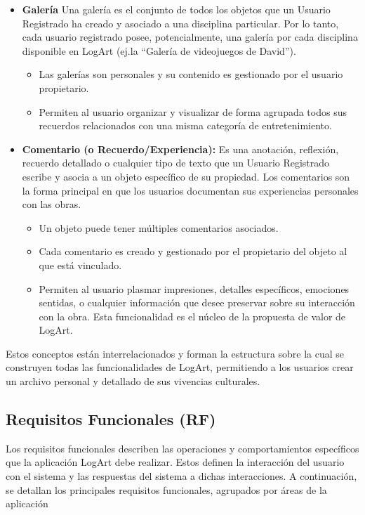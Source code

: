 \begin{itemize}
    \item \textbf{Galería} Una galería es el conjunto de todos los objetos que un Usuario Registrado ha creado y asociado a una disciplina particular. Por lo tanto, cada usuario registrado posee, potencialmente, una galería por cada disciplina disponible en LogArt (ej.la ``Galería de videojuegos de David''). 
    \begin{itemize}
        \item Las galerías son personales y su contenido es gestionado por el usuario propietario.
        \item Permiten al usuario organizar y visualizar de forma agrupada todos sus recuerdos relacionados con una misma categoría de entretenimiento.
    \end{itemize}

    \vspace{0.5cm}

    \item \textbf{Comentario (o Recuerdo/Experiencia):} Es una anotación, reflexión, recuerdo detallado o cualquier tipo de texto que un Usuario Registrado escribe y asocia a un objeto específico de su propiedad. Los comentarios son la forma principal en que los usuarios documentan sus experiencias personales con las obras.
    \begin{itemize}
        \item Un objeto puede tener múltiples comentarios asociados.
        \item Cada comentario es creado y gestionado por el propietario del objeto al que está vinculado.
        \item Permiten al usuario plasmar impresiones, detalles específicos, emociones sentidas, o cualquier información que desee preservar sobre su interacción con la obra. Esta funcionalidad es el núcleo de la propuesta de valor de LogArt.
    \end{itemize}
\end{itemize}

Estos conceptos están interrelacionados y forman la estructura sobre la cual se construyen todas las funcionalidades de LogArt, permitiendo a los usuarios crear un archivo personal y detallado de sus vivencias culturales.

\subsection{Requisitos Funcionales (RF)}
\label{ssec:requisitosFuncionales}

Los requisitos funcionales describen las operaciones y comportamientos específicos que la aplicación LogArt debe realizar. Estos definen la interacción del usuario con el sistema y las respuestas del sistema a dichas interacciones. A continuación, se detallan los principales requisitos funcionales, agrupados por áreas de la aplicación

